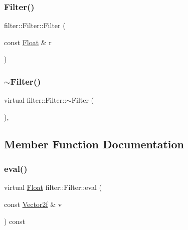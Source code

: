 \subsubsection{\texorpdfstring{Filter()}{Filter()}}
{\footnotesize\ttfamily filter\+::\+Filter\+::\+Filter (\begin{DoxyParamCaption}\item[{const \mbox{\hyperlink{cyclop_8hpp_a07afd7094cb489cbd514c76e6f55d34f}{Float}} \&}]{r }\end{DoxyParamCaption})\hspace{0.3cm}{\ttfamily [inline]}}

\mbox{\label{classfilter_1_1Filter_a7af41fa0bbe0989c78070d6ed81787a2}} 
\subsubsection{\texorpdfstring{$\sim$Filter()}{~Filter()}}
{\footnotesize\ttfamily virtual filter\+::\+Filter\+::$\sim$\+Filter (\begin{DoxyParamCaption}{ }\end{DoxyParamCaption})\hspace{0.3cm}{\ttfamily [inline]}, {\ttfamily [virtual]}}



\subsection{Member Function Documentation}
\mbox{\label{classfilter_1_1Filter_a0d77f7ce8b9b519b4b086e1c01125ec1}} 
\subsubsection{\texorpdfstring{eval()}{eval()}}
{\footnotesize\ttfamily virtual \mbox{\hyperlink{cyclop_8hpp_a07afd7094cb489cbd514c76e6f55d34f}{Float}} filter\+::\+Filter\+::eval (\begin{DoxyParamCaption}\item[{const \mbox{\hyperlink{cyclop_8hpp_a0c5eff6545fe0b71d0592c88d930b697}{Vector2f}} \&}]{v }\end{DoxyParamCaption}) const\hspace{0.3cm}{\ttfamily [pure virtual]}}



